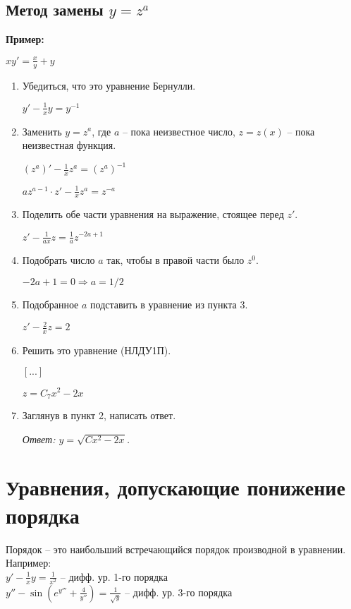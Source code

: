 \documentclass[10pt, a4paper]{article}
\begin{document}
\subsection{Метод замены $y = z^a$}
\textbf{Пример:}
\par $xy' = \frac{x}{y} + y$
\begin{enumerate}
    \item Убедиться, что это уравнение Бернулли.
        \par $y' - \frac{1}{x}y = y^{-1}$
    \item Заменить $y = z^a$, где $a$ -- пока неизвестное число, $z = z(x)$ -- пока неизвестная функция.
        \par $(z^a)' - \frac{1}{x}z^a = (z^a)^{-1}$
        \par{}
        \par $az^{a - 1} \cdot z' - \frac{1}{x}z^a = z^{-a}$
    \item Поделить обе части уравнения на выражение, стоящее перед $z'$.
        \par $z' - \frac{1}{ax}z = \frac{1}{a}z^{-2a + 1}$
    \item Подобрать число $a$ так, чтобы в правой части было $z^0$.
        \par $-2a + 1 = 0 \Rightarrow a = 1/2$
    \item Подобранное $a$ подставить в уравнение из пункта 3.
        \par $z' - \frac{2}{x}z = 2$
    \item Решить это уравнение (НЛДУ1П).
        \par $[...]$
        \par $z = C_{7}x^2-2x$
    \item Заглянув в пункт 2, написать ответ.
        \par\textit{Ответ: $y = \sqrt{Cx^2 - 2x}$.}
\end{enumerate}


\section*{Уравнения, допускающие понижение порядка}
Порядок -- это наибольший встречающийся порядок производной в уравнении. \\
Например: \\
$y' - \frac{1}{x}y = \frac{1}{x^2}$ -- дифф. ур. 1-го порядка \\
$y'' - \sin{(e^{y'''} + \frac{4}{y''})} = \frac{1}{\sqrt{y}}$ -- дифф. ур. 3-го порядка
\end{document}
